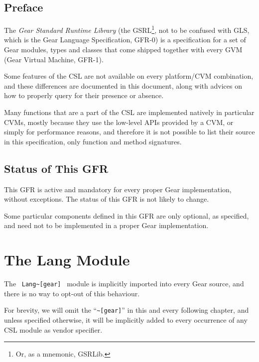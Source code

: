 
\section*{Preface}

The {\em Gear Standard Runtime Library} (the GSRL\footnote{Or, as a mnemonic, GSRLib.}, not to be confused with GLS, which is the Gear Language Specification, GFR-0) is a specification for a set of Gear modules, types and classes that come shipped together with every GVM (Gear Virtual Machine, GFR-1). 

Some features of the CSL are not available on every platform/CVM combination, and these differences are documented in this document, along with advices on how to properly query for their presence or absence. 

Many functions that are a part of the CSL are implemented natively in particular CVMs, mostly because they use the low-level APIs provided by a CVM, or simply for performance reasons, and therefore it is not possible to list their source in this specification, only function and method signatures. 





\section*{Status of This GFR}

This GFR is active and mandatory for every proper Gear implementation, without exceptions. The status of this GFR is not likely to change. 

Some particular components defined in this GFR are only optional, as specified, and need not to be implemented in a proper Gear implementation. 




\chapter{The Lang Module}
\label{sec:lang}

The ~\lstinline!Lang~[gear]!~ module is implicitly imported into every Gear source, and there is no way to opt-out of this behaviour. 

For brevity, we will omit the ``\lstinline!~[gear]!'' in this and every following chapter, and unless specified otherwise, it will be implicitly added to every occurrence of any CSL module as vendor specifier. 

